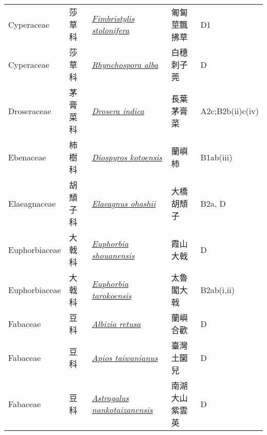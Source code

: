 {\begin{longtable}{p{2.5cm}p{2.5cm}p{4.5cm}p{2.5cm}p{3cm}}
    Cyperaceae & 莎草科 & \href{http://www.theplantlist.org/tpl1.1/search?q=Fimbristylis+stolonifera}{\textit{Fimbristylis stolonifera} } & 匍匐莖飄拂草 & D1 \index{Fimbristylis@\textit{Fimbristylis}!stolonifera@\textit{stolonifera}}  \index{匍匐莖飄拂草} \\
    Cyperaceae & 莎草科 & \href{http://www.theplantlist.org/tpl1.1/search?q=Rhynchospora+alba}{\textit{Rhynchospora alba} } & 白穗刺子莞 & D \index{Rhynchospora@\textit{Rhynchospora}!alba@\textit{alba}}  \index{白穗刺子莞} \\
    Droseraceae & 茅膏菜科 & \href{http://www.theplantlist.org/tpl1.1/search?q=Drosera+indica}{\textit{Drosera indica} } & 長葉茅膏菜 & A2c;B2b(ii)c(iv) \index{Drosera@\textit{Drosera}!indica@\textit{indica}}  \index{長葉茅膏菜} \\
    Ebenaceae & 柿樹科 & \href{http://www.theplantlist.org/tpl1.1/search?q=Diospyros+kotoensis}{\textit{Diospyros kotoensis} } & 蘭嶼柿 & B1ab(iii) \index{Diospyros@\textit{Diospyros}!kotoensis@\textit{kotoensis}}  \index{蘭嶼柿} \\
    Elaeagnaceae & 胡頹子科 & \href{http://www.theplantlist.org/tpl1.1/search?q=Elaeagnus+ohashii}{\textit{Elaeagnus ohashii} } & 大橋胡頹子 & B2a, D \index{Elaeagnus@\textit{Elaeagnus}!ohashii@\textit{ohashii}}  \index{大橋胡頹子} \\
    Euphorbiaceae & 大戟科 & \href{http://www.theplantlist.org/tpl1.1/search?q=Euphorbia+shouanensis}{\textit{Euphorbia shouanensis} } & 霞山大戟 & D \index{Euphorbia@\textit{Euphorbia}!shouanensis@\textit{shouanensis}}  \index{霞山大戟} \\
    Euphorbiaceae & 大戟科 & \href{http://www.theplantlist.org/tpl1.1/search?q=Euphorbia+tarokoensis}{\textit{Euphorbia tarokoensis} } & 太魯閣大戟 & B2ab(i,ii) \index{Euphorbia@\textit{Euphorbia}!tarokoensis@\textit{tarokoensis}}  \index{太魯閣大戟} \\
    Fabaceae & 豆科 & \href{http://www.theplantlist.org/tpl1.1/search?q=Albizia+retusa}{\textit{Albizia retusa} } & 蘭嶼合歡 & D \index{Albizia@\textit{Albizia}!retusa@\textit{retusa}}  \index{蘭嶼合歡} \\
    Fabaceae & 豆科 & \href{http://www.theplantlist.org/tpl1.1/search?q=Apios+taiwanianus}{\textit{Apios taiwanianus} } & 臺灣土圞兒 & D \index{Apios@\textit{Apios}!taiwanianus@\textit{taiwanianus}}  \index{臺灣土圞兒} \\
    Fabaceae & 豆科 & \href{http://www.theplantlist.org/tpl1.1/search?q=Astragalus+nankotaizanensis}{\textit{Astragalus nankotaizanensis} } & 南湖大山紫雲英 & D \index{Astragalus@\textit{Astragalus}!nankotaizanensis@\textit{nankotaizanensis}}  \index{南湖大山紫雲英} \\

\end{longtable}}
